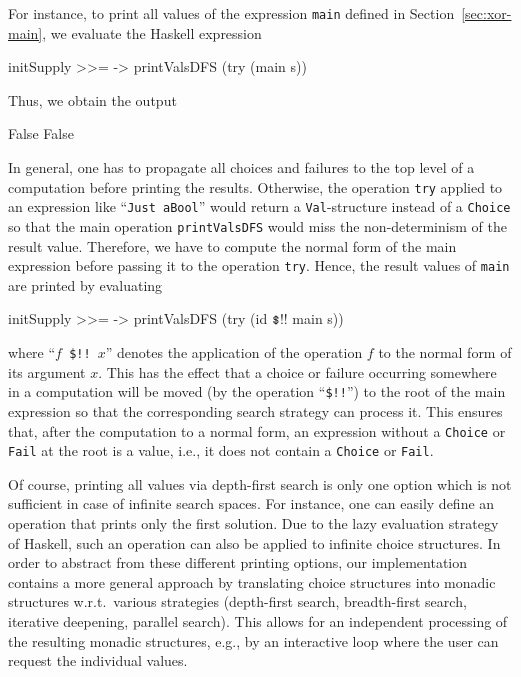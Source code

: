 \documentclass{llncs}
\newcommand{\code}[1]{\mbox{\small\texttt{#1}}}
\newcommand{\ccode}[1]{``\code{#1}''}
\newcommand{\dollar}{\code{\char36}} %
\begin{document}
For instance, to print all values of the expression \code{main}
defined in Section~\ref{sec:xor-main},
we evaluate the Haskell expression
\begin{haskell}
  initSupply >>= \s -> printValsDFS (try (main s))
\end{haskell}
Thus, we obtain the output
\begin{haskell}
  False
  False
\end{haskell}
In general, one has to propagate all choices and failures to the top level
of a computation before printing the results.
Otherwise, the operation \code{try} applied to an expression
like \ccode{Just aBool} would return a \code{Val}-structure
instead of a \code{Choice}
so that the main operation \code{printValsDFS} would miss
the non-determinism of the result value.
Therefore, we have to compute the normal form of the main
expression before passing it to the operation \code{try}.
Hence, the result values of \code{main} are printed by evaluating
\begin{haskell}
  initSupply >>= \s -> printValsDFS (try (id $\dollar$!! main s))
\end{haskell}
where \ccode{$f$ \$!! $x$} %
denotes the application of the operation $f$ to the normal form
of its argument $x$.
This has the effect that a choice or failure occurring somewhere in
a computation will be moved (by the operation \ccode{\$!!})
to the root of the main expression
so that the corresponding search strategy can process it.
This ensures that, after the computation to a normal form,
an expression without a \code{Choice} or \code{Fail} at the root
is a value, i.e., it does not contain a \code{Choice} or \code{Fail}.

Of course, printing all values via depth-first search
is only one option which is not sufficient in case of infinite search
spaces. For instance, one can easily define an operation
that prints only the first solution. Due to the lazy evaluation
strategy of Haskell, such an operation can also be applied to
infinite choice structures.
In order to abstract from these different printing options,
our implementation contains a more general
approach by translating choice structures into monadic structures
w.r.t.\ various strategies (depth-first search, breadth-first search,
iterative deepening, parallel search).
This allows for an independent processing of the resulting monadic structures,
e.g.,
by an interactive loop where the user can request the individual values.


\end{document}
